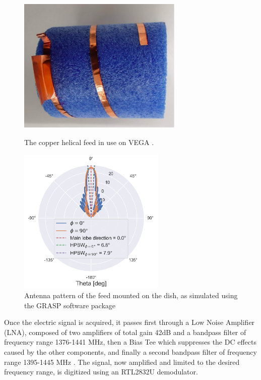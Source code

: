 \begin{figure}[htbp]
    \begin{minipage}[t]{0.5\textwidth}
        \centering
        \captionsetup{width=.9\textwidth}
        \includegraphics[height=6.5cm]{figures/antenna_photo.png}
        \caption{The copper helical feed in use on VEGA \cite{rapport_interne_2024}.}
        \label{fig:antenna_photo}
    \end{minipage}
    \begin{minipage}[t]{0.5\textwidth}
        \centering
        \captionsetup{width=.9\textwidth}
        \includegraphics[height=7cm]{figures/antenna_pattern.png}
        \caption{Antenna pattern of the feed mounted on the dish, as simulated using the GRASP software package \cite{rapport_interne_2024}}
        \label{fig:antenna_pattern}
    \end{minipage}
\end{figure}

Once the electric signal is acquired, it passes first through a Low Noise Amplifier (LNA), composed of two amplifiers of total gain 42dB and a bandpass filter of frequency range 1376-1441 MHz, then a Bias Tee which suppresses the DC effects caused by the other components, and finally a second bandpass filter of frequency range 1395-1445 MHz \cite{interdisciplinary_project_2022}.
The signal, now amplified and limited to the desired frequency range, is digitized using an RTL2832U demodulator. 


